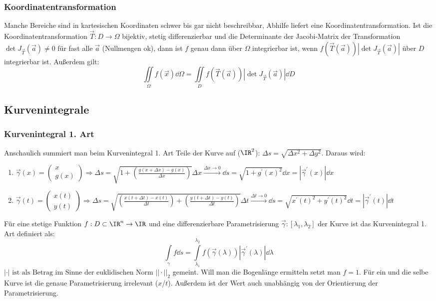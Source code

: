  \subsubsection{Koordinatentransformation}
 Manche Bereiche sind in kartesischen Koordinaten schwer bis gar nicht beschreibbar, Abhilfe liefert eine Koordinatentransformation. Ist die Koordinatentransformation $\vec{T}:D\to\Omega$ bijektiv, stetig differenzierbar und die Determinante der Jacobi-Matrix der Transformation $\det J_{\vec{T}}(\vec{a})\neq 0$ für fast alle $\vec{a}$ (Nullmengen ok), dann ist $f$ genau dann über $\Omega$ integrierbar ist, wenn $f(\vec{T}(\vec{a}))\left|\det J_{\vec{T}}(\vec{a}) \right|$ über $D$ integrierbar ist. Außerdem gilt: 
 \begin{equation}
 	\iint\limits_\Omega f (\vec{x})\dd\Omega=\iint\limits_D f(\vec{T}(\vec{a}))\left|\det J_{\vec{T}}(\vec{a}) \right|\dd D
 \end{equation}
 \subsection{Kurvenintegrale}
 \subsubsection{Kurvenintegral 1. Art}
 Anschaulich summiert man beim Kurvenintegral 1. Art Teile der Kurve auf ($\IR^2$): $\Delta s=\sqrt{\Delta x^2+\Delta y^2}$. Daraus wird:
 \begin{enumerate}
 	\item $\vec{\gamma}(x)=\begin{pmatrix}
 		x\\g(x)
 	\end{pmatrix} \Rightarrow \Delta s = \sqrt{1+\left(\frac{g(x+\Delta x)-g(x)}{\Delta x}\right)}\Delta x \xrightarrow{\Delta x \to 0} \dd s = \sqrt{1+g^\prime(x)^2}\dd x = |\vec{\gamma}^\prime(x)|\dd x$
 	\item  $\vec{\gamma}(t)=\begin{pmatrix}
 		x(t)\\y(t)
 	\end{pmatrix}\Rightarrow\Delta s = \sqrt{\left(\frac{x(t+\Delta t)-x(t)}{\Delta t}\right)+\left(\frac{y(t+\Delta t)-y(t)}{\Delta t}\right)}\Delta t\xrightarrow{\Delta t \to 0} \dd s = \sqrt{x^\prime(t)^2+y^\prime(t)^2} \dd t = |\vec{\gamma}^\prime(t)|\dd t$
 \end{enumerate} 
 Für eine stetige Funktion $f: D\subset \IR^n\to\IR$ und eine differenzierbare Parametrisierung $\vec{\gamma}:[\lambda_1,\lambda_2]$ der Kurve ist das Kurvenintegral 1. Art definiert als:
 \begin{equation}
 	\int\limits_\gamma f \dd s = \int\limits_{\lambda_1}^{\lambda_2} f(\vec{\gamma} (\lambda)) |\vec{\gamma}^\prime(\lambda)|\dd \lambda
 \end{equation}
 $|\cdot|\text{ ist als Betrag im Sinne der euklidischen Norm } ||\cdot||_2$ gemeint. Will man die Bogenlänge ermitteln setzt man $f=1$. Für ein und die selbe Kurve ist die genaue Parametrisierung irrelevant ($x$/$t$). Außerdem ist der Wert auch unabhängig von der Orientierung der Parametrisierung.
